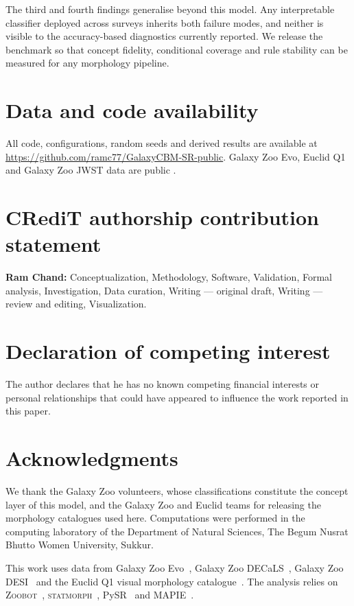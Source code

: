 \documentclass[11pt]{article}
\begin{document}
The third and fourth findings generalise beyond this model. Any interpretable
classifier deployed across surveys inherits both failure modes, and neither is
visible to the accuracy-based diagnostics currently reported. We release the
benchmark so that concept fidelity, conditional coverage and rule stability
can be measured for any morphology pipeline.

\section*{Data and code availability}
\label{sec:availability}

All code, configurations, random seeds and derived results are available at
\url{https://github.com/ramc77/GalaxyCBM-SR-public}. Galaxy Zoo Evo, Euclid Q1 and
Galaxy Zoo JWST data are public
\citep{walmsley2025gzevo,euclid2025morphology}.

\section*{CRediT authorship contribution statement}

\textbf{Ram Chand:} Conceptualization, Methodology, Software, Validation,
Formal analysis, Investigation, Data curation, Writing --- original draft,
Writing --- review and editing, Visualization.

\section*{Declaration of competing interest}

The author declares that he has no known competing financial interests or
personal relationships that could have appeared to influence the work reported
in this paper.

\section*{Acknowledgments}
We thank the Galaxy Zoo volunteers, whose classifications constitute the
concept layer of this model, and the Galaxy Zoo and Euclid teams for releasing
the morphology catalogues used here. Computations were performed in the
computing laboratory of the Department of Natural Sciences, The Begum Nusrat
Bhutto Women University, Sukkur.

This work uses data from Galaxy Zoo Evo~\citep{walmsley2025gzevo}, Galaxy Zoo
DECaLS~\citep{walmsley2022}, Galaxy Zoo DESI~\citep{walmsley2023desi} and the
Euclid Q1 visual morphology catalogue~\citep{euclid2025morphology}. The
analysis relies on \textsc{Zoobot}~\citep{walmsley2023zoobot},
\textsc{statmorph}~\citep{rodriguez2019}, PySR~\citep{cranmer2023} and
MAPIE~\citep{taquet2022}.
\end{document}
